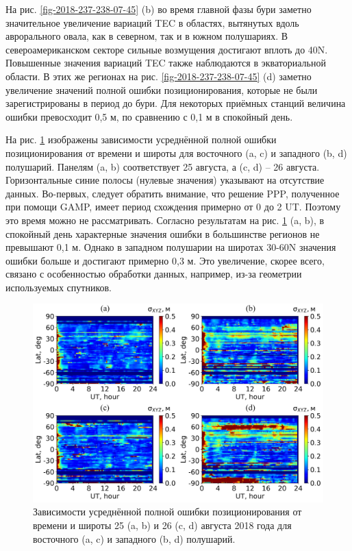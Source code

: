 На рис. \ref{fig-2018-237-238-07-45} (b) во время главной фазы бури заметно значительное увеличение вариаций TEC в областях, вытянутых вдоль аврорального овала, как в северном, так и в южном полушариях.
В североамериканском секторе сильные возмущения достигают вплоть до 40\degree N.
Повышенные значения вариаций TEC также наблюдаются в экваториальной области.
В этих же регионах на рис. \ref{fig-2018-237-238-07-45} (d) заметно увеличение значений полной ошибки позиционирования, которые не были зарегистрированы в период до бури.
Для некоторых приёмных станций величина ошибки превосходит 0,5 м, по сравнению с 0,1 м в спокойный день. 

На рис. \ref{fig-2018-237-238} изображены зависимости усреднённой полной ошибки позиционирования от времени и широты для восточного (a, c) и западного (b, d) полушарий.
Панелям (a, b) соответствует 25 августа, а (c, d) -- 26 августа.
Горизонтальные синие полосы (нулевые значения) указывают на отсутствие данных.
Во-первых, следует обратить внимание, что решение PPP, полученное при помощи GAMP, имеет период схождения примерно от 0 до 2 UT.
Поэтому это время можно не рассматривать.
Согласно результатам на рис. \ref{fig-2018-237-238} (a, b), в спокойный день характерные значения ошибки в большинстве регионов не превышают 0,1 м.
Однако в западном полушарии на широтах 30-60\degree N значения ошибки больше и достигают примерно 0,3 м.
Это увеличение, скорее всего, связано с особенностью обработки данных, например, из-за геометрии используемых спутников. 
\begin{figure}[h]
\includegraphics[width=\textwidth]{fig/2018-237-238.png}    
\caption{Зависимости усреднённой полной ошибки позиционирования от времени и широты 25 (a, b) и 26 (c, d) августа 2018 года для восточного (a, c) и западного (b, d) полушарий.} 
\label{fig-2018-237-238}      
\end{figure} 


